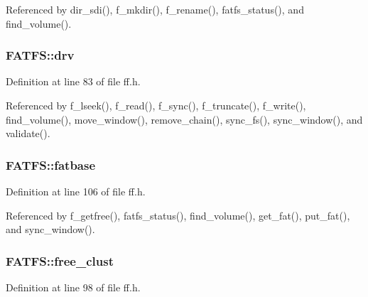 Referenced by dir\+\_\+sdi(), f\+\_\+mkdir(), f\+\_\+rename(), fatfs\+\_\+status(), and find\+\_\+volume().

\subsubsection[{\texorpdfstring{drv}{drv}}]{ F\+A\+T\+F\+S\+::drv}\hypertarget{structFATFS_a6a791560e2687e8b1569bfce61208d2d}{}\label{structFATFS_a6a791560e2687e8b1569bfce61208d2d}


Definition at line 83 of file ff.\+h.



Referenced by f\+\_\+lseek(), f\+\_\+read(), f\+\_\+sync(), f\+\_\+truncate(), f\+\_\+write(), find\+\_\+volume(), move\+\_\+window(), remove\+\_\+chain(), sync\+\_\+fs(), sync\+\_\+window(), and validate().

\subsubsection[{\texorpdfstring{fatbase}{fatbase}}]{ F\+A\+T\+F\+S\+::fatbase}\hypertarget{structFATFS_a848fba02c4aabe02ef2984e578f33d64}{}\label{structFATFS_a848fba02c4aabe02ef2984e578f33d64}


Definition at line 106 of file ff.\+h.



Referenced by f\+\_\+getfree(), fatfs\+\_\+status(), find\+\_\+volume(), get\+\_\+fat(), put\+\_\+fat(), and sync\+\_\+window().

\subsubsection[{\texorpdfstring{free\+\_\+clust}{free_clust}}]{ F\+A\+T\+F\+S\+::free\+\_\+clust}\hypertarget{structFATFS_a5fb49e6ac511bd97eaffdd636d0e4165}{}\label{structFATFS_a5fb49e6ac511bd97eaffdd636d0e4165}


Definition at line 98 of file ff.\+h.



